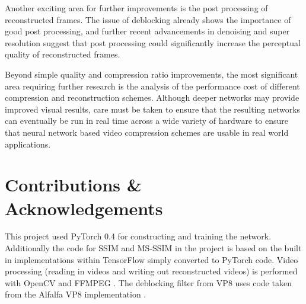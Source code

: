 \documentclass[10pt,twocolumn,letterpaper]{article}
\begin{document}
Another exciting area for further improvements is the post processing of reconstructed frames. The issue of deblocking already shows the importance of good post processing, and further recent advancements in denoising and super resolution suggest that post processing could significantly increase the perceptual quality of reconstructed frames.

Beyond simple quality and compression ratio improvements, the most significant area requiring further research is the analysis of the performance cost of different compression and reconstruction schemes. Although deeper networks may provide improved visual results, care must be taken to ensure that the resulting networks can eventually be run in real time across a wide variety of hardware to ensure that neural network based video compression schemes are usable in real world applications.

\section{Contributions \& Acknowledgements}
This project used PyTorch 0.4 \cite{pytorch} for constructing and training the network. Additionally the code for SSIM and MS-SSIM in the project is based on the built in implementations within TensorFlow \cite{tensorflow} simply converted to PyTorch code. Video processing (reading in videos and writing out reconstructed videos) is performed with OpenCV \cite{opencv} and FFMPEG \cite{ffmpeg}. The deblocking filter from VP8 uses code taken from the Alfalfa VP8 implementation \cite{alfalfa}.


{\small


}
\end{document}
